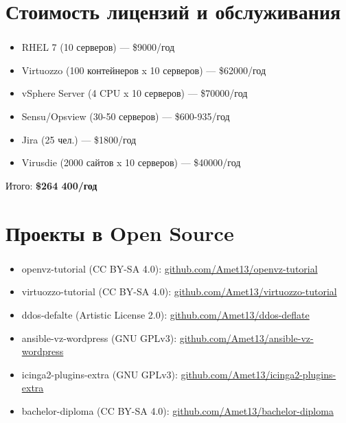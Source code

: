 
\section{Стоимость лицензий и обслуживания}

\begin{frame}
\frametitle{\insertsection}
\begin{itemize}
	\item RHEL 7 (10 серверов) --- \$9000/год
	\item Virtuozzo (100 контейнеров x 10 серверов) --- \$62000/год
	\item vSphere Server (4 CPU x 10 серверов) --- \$70000/год
	\item Sensu/Opsview (30-50 серверов) --- \$600-935/год
	\item Jira (25 чел.) --- \$1800/год
	\item Virusdie (2000 сайтов x 10 серверов) --- \$40000/год
\end{itemize}
Итого: \bf{\$264 400/год}
\end{frame}


\section{Проекты в Open Source}

\begin{frame}
\frametitle{\insertsection}
\begin{itemize}
	\item openvz-tutorial (CC BY-SA 4.0): \href{https://github.com/Amet13/openvz-tutorial}{github.com/Amet13/openvz-tutorial}
	\item virtuozzo-tutorial (CC BY-SA 4.0): \href{https://github.com/Amet13/virtuozzo-tutorial}{github.com/Amet13/virtuozzo-tutorial}
	\item ddos-defalte (Artistic License 2.0): \href{https://github.com/Amet13/ddos-deflate}{github.com/Amet13/ddos-deflate}
	\item ansible-vz-wordpress (GNU GPLv3): \href{https://github.com/Amet13/ansible-vz-wordpress}{github.com/Amet13/ansible-vz-wordpress}
	\item icinga2-plugins-extra (GNU GPLv3): \href{https://github.com/Amet13/icinga2-plugins-extra}{github.com/Amet13/icinga2-plugins-extra}
	\item bachelor-diploma (CC BY-SA 4.0): \href{https://github.com/Amet13/bachelor-diploma}{github.com/Amet13/bachelor-diploma}
\end{itemize}
\end{frame}


\frame[plain]{\titlepage} %
